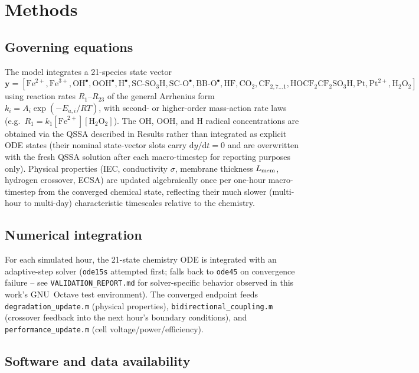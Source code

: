 \documentclass[10pt,twocolumn]{article}
\begin{document}
\section{Methods}

\subsection{Governing equations}

The model integrates a 21-species state vector
$\mathbf{y}=[\text{Fe}^{2+},\text{Fe}^{3+},\text{OH}^\bullet,
\text{OOH}^\bullet,\text{H}^\bullet,\text{SC-SO}_3\text{H},
\text{SC-O}^\bullet,\text{BB-O}^\bullet,\text{HF},\text{CO}_2,
\text{CF}_{2,7\ldots1},\text{HOCF}_2\text{CF}_2\text{SO}_3\text{H},
\text{Pt},\text{Pt}^{2+},\text{H}_2\text{O}_2]$ using reaction rates
$R_1$--$R_{23}$ of the general Arrhenius form
$k_i=A_i\exp(-E_{a,i}/RT)$, with second- or higher-order mass-action rate
laws (e.g.\ $R_1=k_1[\text{Fe}^{2+}][\text{H}_2\text{O}_2]$). The OH,
OOH, and H radical concentrations are obtained via the QSSA described in
Results rather than integrated as explicit ODE states (their nominal
state-vector slots carry $\mathrm{d}y/\mathrm{d}t=0$ and are overwritten
with the fresh QSSA solution after each macro-timestep for reporting
purposes only). Physical properties (IEC, conductivity $\sigma$,
membrane thickness $L_{\rm mem}$, hydrogen crossover, ECSA) are updated
algebraically once per one-hour macro-timestep from the converged
chemical state, reflecting their much slower (multi-hour to multi-day)
characteristic timescales relative to the chemistry.

\subsection{Numerical integration}

For each simulated hour, the 21-state chemistry ODE is integrated with
an adaptive-step solver (\texttt{ode15s} attempted first; falls back to
\texttt{ode45} on convergence failure -- see \texttt{VALIDATION\_REPORT.md}
for solver-specific behavior observed in this work's GNU~Octave test
environment). The converged endpoint feeds
\texttt{degradation\_update.m} (physical properties),
\texttt{bidirectional\_coupling.m} (crossover feedback into the next
hour's boundary conditions), and \texttt{performance\_update.m} (cell
voltage/power/efficiency).

\subsection{Software and data availability}
\end{document}
